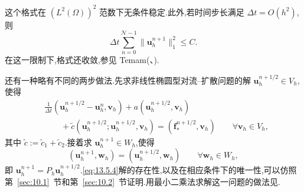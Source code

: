 这个格式在 \((L^2(\Omega))^2\) 范数下无条件稳定.此外,若时间步长满足 \(\Delta t=O(h^2)\),则
\[
  \Delta t\sum_{n=0}^{\mathcal N-1}\|\boldsymbol{u}_h^{n+1}\|_1^2\le C.
\]
在这一限制下,格式还收敛,参见 Temam(、).

还有一种略有不同的两步做法.先求非线性椭圆型对流--扩散问题的解 \(\boldsymbol{u}_h^{n+1/2}\in V_h\),使得
\begin{equation}\label{eq:13.5.4}
  \begin{aligned}
    &\frac1{\Delta t}(\boldsymbol{u}_h^{n+1/2}-\boldsymbol{u}_h^n,\boldsymbol{v}_h)
       +a(\boldsymbol{u}_h^{n+1/2},\boldsymbol{v}_h)\\
    &\qquad+\widetilde c(\boldsymbol{u}_h^{n+1/2};\boldsymbol{u}_h^{n+1/2},\boldsymbol{v}_h)
        =(\boldsymbol{f}_*^{n+1/2},\boldsymbol{v}_h)\qquad\forall\boldsymbol{v}_h\in V_h,
  \end{aligned}
\end{equation}
其中 \(\widetilde c:=\widetilde c_1+\widetilde c_2\).接着求 \(\boldsymbol{u}_h^{n+1}\in W_h\),使得
\begin{equation}\label{eq:13.5.5}
  (\boldsymbol{u}_h^{n+1},\boldsymbol{w}_h)=(\boldsymbol{u}_h^{n+1/2},\boldsymbol{w}_h)
       \qquad\forall\boldsymbol{w}_h\in W_h,
\end{equation}
即 \(\boldsymbol{u}_h^{n+1}=P_h\boldsymbol{u}_h^{n+1/2}\).\eqref{eq:13.5.4}解的存在性,以及在相应条件下的唯一性,可以仿照第~\ref{sec:10.1}~节和第~\ref{sec:10.2}~节证明.用最小二乘法求解这一问题的做法见.

